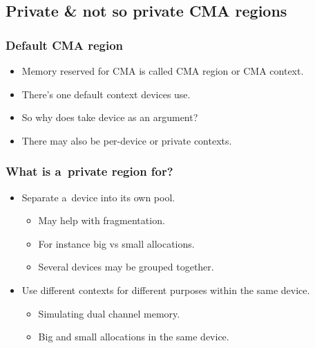 \subsection{Private \& not so private CMA regions}

\begin{frame}
  \frametitle{Default CMA region}

  \begin{itemize}
  \item Memory reserved for CMA is called CMA region or CMA context.
  \item There's one default context devices use.
  \item So why does  take
    device as an argument?
  \item There may also be per-device or private contexts.
  \end{itemize}
\end{frame}

\begin{frame}
  \frametitle{What is a~private region for?}

  \begin{itemize}
  \item Separate a~device into its own pool.
    \begin{itemize}
    \item May help with fragmentation.
    \item For instance big vs small allocations.
    \item Several devices may be grouped together.
    \end{itemize}
  \item Use different contexts for different purposes within the same
    device.
    \begin{itemize}
    \item Simulating dual channel memory.
    \item Big and small allocations in the same device.
    \end{itemize}
  \end{itemize}
\end{frame}

